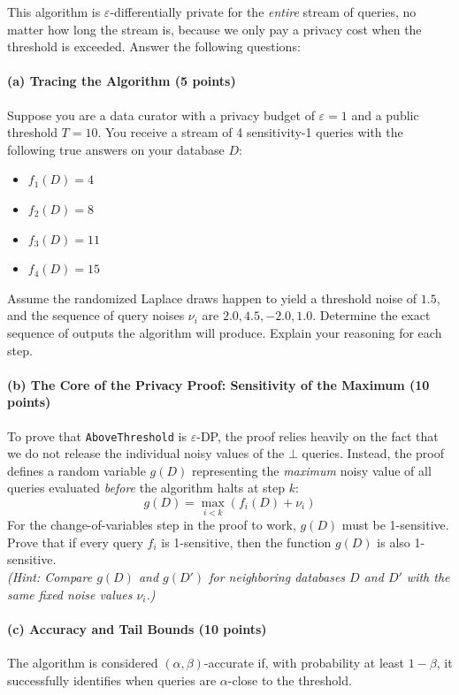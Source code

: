 \documentclass[12pt]{article}
\begin{document}
\begin{enumerate}
This algorithm is $\varepsilon$-differentially private for the \textit{entire} stream of queries, no matter how long the stream is, because we only pay a privacy cost when the threshold is exceeded. Answer the following questions:

\paragraph{(a) Tracing the Algorithm (5 points)}
Suppose you are a data curator with a privacy budget of $\varepsilon = 1$ and a public threshold $T = 10$. You receive a stream of 4 sensitivity-1 queries with the following true answers on your database $D$:
\begin{itemize}
    \item $f_1(D) = 4$
    \item $f_2(D) = 8$
    \item $f_3(D) = 11$
    \item $f_4(D) = 15$
\end{itemize}
Assume the randomized Laplace draws happen to yield a threshold noise of $1.5$, and the sequence of query noises $\nu_i$ are $2.0, 4.5, -2.0, 1.0$. Determine the exact sequence of outputs the algorithm will produce. Explain your reasoning for each step.

\paragraph{(b) The Core of the Privacy Proof: Sensitivity of the Maximum (10 points)}
To prove that \texttt{AboveThreshold} is $\varepsilon$-DP, the proof relies heavily on the fact that we do not release the individual noisy values of the $\bot$ queries. Instead, the proof defines a random variable $g(D)$ representing the \textit{maximum} noisy value of all queries evaluated \textit{before} the algorithm halts at step $k$:
$$g(D) = \max_{i < k} (f_i(D) + \nu_i)$$
For the change-of-variables step in the proof to work, $g(D)$ must be 1-sensitive. Prove that if every query $f_i$ is 1-sensitive, then the function $g(D)$ is also 1-sensitive. \\
\textit{(Hint: Compare $g(D)$ and $g(D')$ for neighboring databases $D$ and $D'$ with the same fixed noise values $\nu_i$.)}

\paragraph{(c) Accuracy and Tail Bounds (10 points)}
The algorithm is considered $(\alpha, \beta)$-accurate if, with probability at least $1 - \beta$, it successfully identifies when queries are $\alpha$-close to the threshold. 


\end{enumerate}
\end{document}

